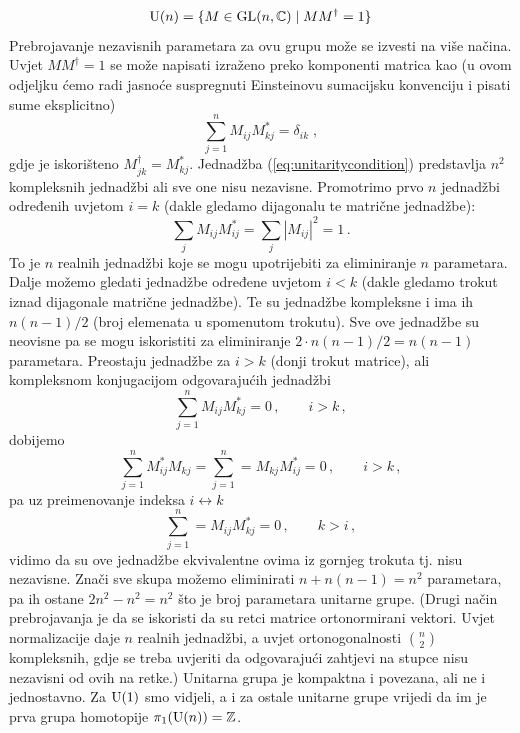 \begin{enumerate}[leftmargin=0pt, itemindent=0pt]
\begin{equation}
\mathrm{U}(n) = \{ M\in \mathrm{GL}(n,\mathbb{C}) \; | \; M M^{\dagger} = 1\}
\end{equation}
Prebrojavanje nezavisnih parametara za ovu grupu može se izvesti
na više načina. Uvjet $M M^\dagger = 1$ se može napisati izraženo
preko komponenti matrica kao (u ovom odjeljku ćemo radi jasnoće
suspregnuti Einsteinovu sumacijsku konvenciju i pisati sume eksplicitno)
\begin{equation}
\sum_{j=1}^{n} M_{ij} M_{kj}^* = \delta_{ik}\;,
\label{eq:unitaritycondition}
\end{equation}
gdje je iskorišteno $M^{\dagger}_{jk} = M^{*}_{kj}$.
Jednadžba (\ref{eq:unitaritycondition}) predstavlja $n^2$ kompleksnih
jednadžbi ali sve one nisu nezavisne. Promotrimo prvo $n$ jednadžbi
određenih uvjetom $i=k$ (dakle gledamo dijagonalu te matrične jednadžbe):
\begin{equation}
 \sum_j M_{ij} M^{*}_{ij} = \sum_j |M_{ij}|^2 = 1 \,.
\label{eq:diagonalcondition}
\end{equation}
To je $n$ realnih jednadžbi koje se mogu upotrijebiti za eliminiranje
$n$ parametara. Dalje možemo gledati jednadžbe određene uvjetom
$i < k$ (dakle gledamo trokut iznad dijagonale matrične jednadžbe).
Te su jednadžbe kompleksne i ima ih $n(n-1)/2$ (broj elemenata u 
spomenutom trokutu). Sve ove jednadžbe su neovisne pa se mogu
iskoristiti za eliminiranje $2 \cdot n(n-1)/2 = n(n-1)$ parametara.
Preostaju jednadžbe za $i >k$ (donji trokut matrice), ali kompleksnom
konjugacijom odgovarajućih jednadžbi
\begin{equation}
\sum_{j=1}^{n} M_{ij} M_{kj}^* = 0\,, \qquad i>k \,,
\end{equation}
dobijemo
\begin{equation}
\sum_{j=1}^{n} M_{ij}^* M_{kj}  = \sum_{j=1}^{n} = M_{kj} M_{ij}^* = 0\,, \qquad i>k \,,
\end{equation}
pa uz preimenovanje indeksa $i \leftrightarrow k$
\begin{equation}
\sum_{j=1}^{n} =  M_{ij} M_{kj}^* = 0\,, \qquad k>i \,,
\end{equation}
vidimo da su ove jednadžbe ekvivalentne ovima iz gornjeg trokuta tj. nisu
nezavisne.
Znači sve skupa možemo eliminirati $n + n(n-1) = n^2$ parametara, pa ih
ostane $2n^2 - n^2 = n^2$ što je broj parametara unitarne grupe.
(Drugi način prebrojavanja je da se iskoristi da su retci matrice ortonormirani
vektori. Uvjet normalizacije daje $n$ realnih jednadžbi, a uvjet
ortonogonalnosti $\binom{n}{2}$ kompleksnih, gdje se treba uvjeriti
da odgovarajući zahtjevi na stupce nisu nezavisni od ovih na retke.)
Unitarna grupa je kompaktna i povezana, ali ne i jednostavno. Za $\mathrm{U}(1)$
smo vidjeli, a i za ostale unitarne grupe
vrijedi da im je prva grupa homotopije $\pi_{1}(\mathrm{U}(n)) = \mathbb{Z}$.


\end{enumerate}
